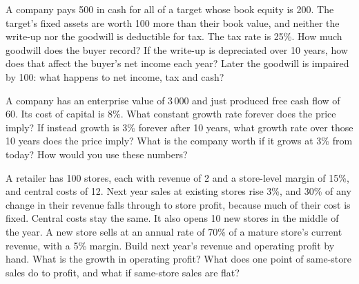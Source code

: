 \begin{question}\label{iq:iv2:valuation-and-financial-statements:21}
A company pays 500 in cash for all of a target whose book equity is 200. The target's fixed assets are worth 100 more than their book value, and neither the write-up nor the goodwill is deductible for tax. The tax rate is 25\%. How much goodwill does the buyer record? If the write-up is depreciated over 10 years, how does that affect the buyer's net income each year? Later the goodwill is impaired by 100: what happens to net income, tax and cash?
\end{question}

\begin{question}\label{iq:iv2:valuation-and-financial-statements:22}
A company has an enterprise value of 3\,000 and just produced free cash flow of 60. Its cost of capital is 8\%. What constant growth rate forever does the price imply? If instead growth is 3\% forever after 10 years, what growth rate over those 10 years does the price imply? What is the company worth if it grows at 3\% from today? How would you use these numbers?
\end{question}

\begin{question}\label{iq:iv2:valuation-and-financial-statements:23}
A retailer has 100 stores, each with revenue of 2 and a store-level margin of 15\%, and central costs of 12. Next year sales at existing stores rise 3\%, and 30\% of any change in their revenue falls through to store profit, because much of their cost is fixed. Central costs stay the same. It also opens 10 new stores in the middle of the year. A new store sells at an annual rate of 70\% of a mature store's current revenue, with a 5\% margin. Build next year's revenue and operating profit by hand. What is the growth in operating profit? What does one point of same-store sales do to profit, and what if same-store sales are flat?
\end{question}

